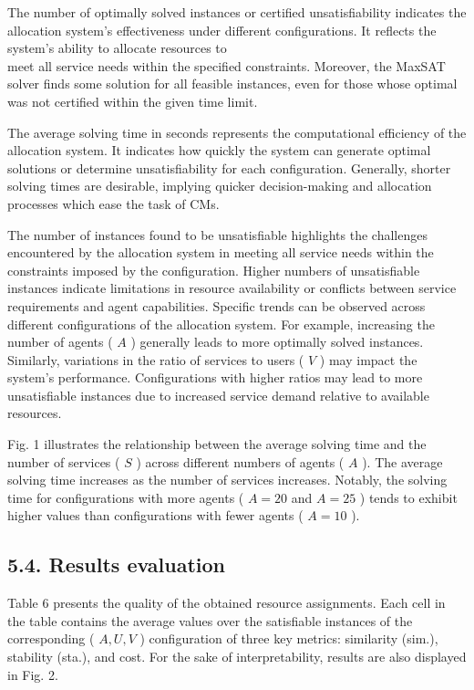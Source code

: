 \documentclass[10pt]{article}
\begin{document}
The number of optimally solved instances or certified unsatisfiability indicates the allocation system's effectiveness under different configurations. It reflects the system's ability to allocate resources to\\
meet all service needs within the specified constraints. Moreover, the MaxSAT solver finds some solution for all feasible instances, even for those whose optimal was not certified within the given time limit.

The average solving time in seconds represents the computational efficiency of the allocation system. It indicates how quickly the system can generate optimal solutions or determine unsatisfiability for each configuration. Generally, shorter solving times are desirable, implying quicker decision-making and allocation processes which ease the task of CMs.

The number of instances found to be unsatisfiable highlights the challenges encountered by the allocation system in meeting all service needs within the constraints imposed by the configuration. Higher numbers of unsatisfiable instances indicate limitations in resource availability or conflicts between service requirements and agent capabilities. Specific trends can be observed across different configurations of the allocation system. For example, increasing the number of agents ( $A$ ) generally leads to more optimally solved instances. Similarly, variations in the ratio of services to users ( $V$ ) may impact the system's performance. Configurations with higher ratios may lead to more unsatisfiable instances due to increased service demand relative to available resources.

Fig. 1 illustrates the relationship between the average solving time and the number of services ( $S$ ) across different numbers of agents ( $A$ ). The average solving time increases as the number of services increases. Notably, the solving time for configurations with more agents ( $A=20$ and $A=25$ ) tends to exhibit higher values than configurations with fewer agents ( $A=10$ ).

\subsection*{5.4. Results evaluation}
Table 6 presents the quality of the obtained resource assignments. Each cell in the table contains the average values over the satisfiable instances of the corresponding ( $A, U, V$ ) configuration of three key metrics: similarity (sim.), stability (sta.), and cost. For the sake of interpretability, results are also displayed in Fig. 2.
\end{document}
